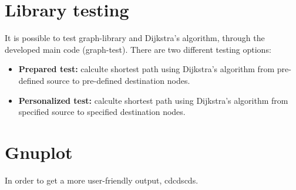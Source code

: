 \documentclass{article}                                                                                                     %
\begin{document}
\section{Library testing}                                                                                                   %
  It is possible to test graph-library and Dijkstra's algorithm, through the developed main code (graph-test). There are    %
  two different testing options:  
  \begin{itemize}                                                                                                           %
    \item \textbf{Prepared test:}                                                                                           %
    calculte shortest path using Dijkstra's algorithm from pre-defined source to pre-defined destination nodes.
    \item \textbf{Personalized test:}
    calculte shortest path using Dijkstra's algorithm from specified source to specified destination nodes.
  \end{itemize}                                                                                                             %
\label{sec:library_testing}                                                                                                 %

\section{Gnuplot}                                                                                                           %
  In order to get a more user-friendly output, cdcdscds.               %
\label{sec:gnuplot}                                                                                                         %

\end{document}
